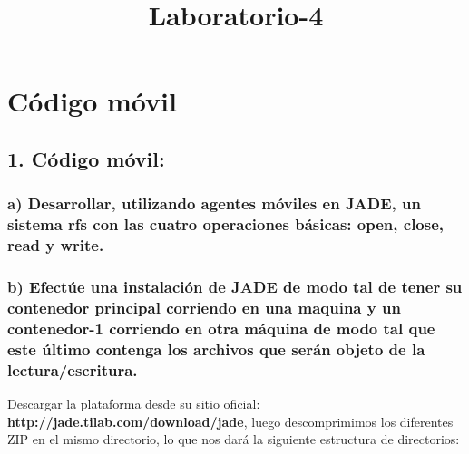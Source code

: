 \documentclass[11pt]{article}
\title{Laboratorio-4}
\begin{document}
    
    
    \maketitle
    
    

    
    \hypertarget{cuxf3digo-muxf3vil}{%
\section{Código móvil}\label{cuxf3digo-muxf3vil}}

    \hypertarget{cuxf3digo-muxf3vil}{%
\subsection{1. Código móvil:}\label{cuxf3digo-muxf3vil}}

    \hypertarget{a-desarrollar-utilizando-agentes-muxf3viles-en-jade-un-sistema-rfs-con-las-cuatro-operaciones-buxe1sicas-open-close-read-y-write.}{%
\subsubsection{a) Desarrollar, utilizando agentes móviles en JADE, un
sistema rfs con las cuatro operaciones básicas: open, close, read y
write.}\label{a-desarrollar-utilizando-agentes-muxf3viles-en-jade-un-sistema-rfs-con-las-cuatro-operaciones-buxe1sicas-open-close-read-y-write.}}

    \hypertarget{b-efectuxfae-una-instalaciuxf3n-de-jade-de-modo-tal-de-tener-su-contenedor-principal-corriendo-en-una-maquina-y-un-contenedor-1-corriendo-en-otra-muxe1quina-de-modo-tal-que-este-uxfaltimo-contenga-los-archivos-que-seruxe1n-objeto-de-la-lecturaescritura.}{%
\subsubsection{b) Efectúe una instalación de JADE de modo tal de tener
su contenedor principal corriendo en una maquina y un contenedor-1
corriendo en otra máquina de modo tal que este último contenga los
archivos que serán objeto de la
lectura/escritura.}\label{b-efectuxfae-una-instalaciuxf3n-de-jade-de-modo-tal-de-tener-su-contenedor-principal-corriendo-en-una-maquina-y-un-contenedor-1-corriendo-en-otra-muxe1quina-de-modo-tal-que-este-uxfaltimo-contenga-los-archivos-que-seruxe1n-objeto-de-la-lecturaescritura.}}

    Descargar la plataforma desde su sitio oficial:
\textbf{http://jade.tilab.com/download/jade}, luego descomprimimos los
diferentes ZIP en el mismo directorio, lo que nos dará la siguiente
estructura de directorios:
\end{document}
